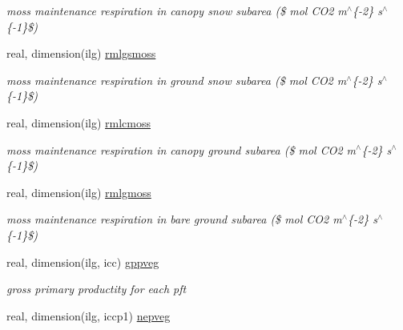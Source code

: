 \begin{DoxyCompactItemize}
\begin{DoxyCompactList}\small\item\em moss maintenance respiration in canopy snow subarea (\$ mol C\+O2 m$^\wedge$\{-\/2\} s$^\wedge$\{-\/1\}\$) \end{DoxyCompactList}\item 
\hypertarget{structctem__statevars_1_1veg__gat_a13837107586848cdf708ca7d97047fd5}{}real, dimension(ilg) \hyperlink{structctem__statevars_1_1veg__gat_a13837107586848cdf708ca7d97047fd5}{rmlgsmoss}\label{structctem__statevars_1_1veg__gat_a13837107586848cdf708ca7d97047fd5}

\begin{DoxyCompactList}\small\item\em moss maintenance respiration in ground snow subarea (\$ mol C\+O2 m$^\wedge$\{-\/2\} s$^\wedge$\{-\/1\}\$) \end{DoxyCompactList}\item 
\hypertarget{structctem__statevars_1_1veg__gat_a6c138212d6d5f165f401cf9109f75513}{}real, dimension(ilg) \hyperlink{structctem__statevars_1_1veg__gat_a6c138212d6d5f165f401cf9109f75513}{rmlcmoss}\label{structctem__statevars_1_1veg__gat_a6c138212d6d5f165f401cf9109f75513}

\begin{DoxyCompactList}\small\item\em moss maintenance respiration in canopy ground subarea (\$ mol C\+O2 m$^\wedge$\{-\/2\} s$^\wedge$\{-\/1\}\$) \end{DoxyCompactList}\item 
\hypertarget{structctem__statevars_1_1veg__gat_a1b444eb1fd23d9db75733a4025cc16dc}{}real, dimension(ilg) \hyperlink{structctem__statevars_1_1veg__gat_a1b444eb1fd23d9db75733a4025cc16dc}{rmlgmoss}\label{structctem__statevars_1_1veg__gat_a1b444eb1fd23d9db75733a4025cc16dc}

\begin{DoxyCompactList}\small\item\em moss maintenance respiration in bare ground subarea (\$ mol C\+O2 m$^\wedge$\{-\/2\} s$^\wedge$\{-\/1\}\$) \end{DoxyCompactList}\item 
\hypertarget{structctem__statevars_1_1veg__gat_a591d47bd50185af4c1b625cc976162f3}{}real, dimension(ilg, icc) \hyperlink{structctem__statevars_1_1veg__gat_a591d47bd50185af4c1b625cc976162f3}{gppveg}\label{structctem__statevars_1_1veg__gat_a591d47bd50185af4c1b625cc976162f3}

\begin{DoxyCompactList}\small\item\em gross primary productity for each pft \end{DoxyCompactList}\item 
\hypertarget{structctem__statevars_1_1veg__gat_afca62bde55e84abec322cece5c965fb7}{}real, dimension(ilg, iccp1) \hyperlink{structctem__statevars_1_1veg__gat_afca62bde55e84abec322cece5c965fb7}{nepveg}\label{structctem__statevars_1_1veg__gat_afca62bde55e84abec322cece5c965fb7}


\end{DoxyCompactItemize}
